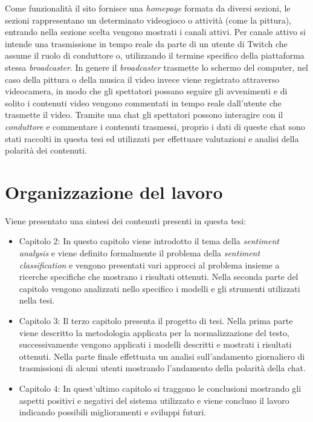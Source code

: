 \documentclass[a4paper,12pt,openright,twoside]{report}
\theoremstyle{definition}
\begin{document}
Come funzionalità il sito fornisce una \emph{homepage} formata da diversi sezioni, le sezioni rappresentano
un determinato videogioco o attività (come la pittura), entrando nella sezione scelta vengono
mostrati i canali attivi. Per canale attivo si intende una trasmissione in tempo reale da parte di un 
utente di Twitch che assume il ruolo di conduttore o, utilizzando il termine specifico della piattaforma stessa 
\emph{broadcaster}. In genere il \emph{broadcaster} trasmette lo schermo del computer,
nel caso della pittura o della musica il video invece viene registrato attraverso videocamera, in modo che gli
spettatori possano seguire gli avvenimenti e di solito i contenuti video vengono commentati in tempo reale
dall'utente che trasmette il video.
Tramite una chat gli spettatori possono interagire con il \emph{conduttore} e commentare i contenuti
trasmessi, proprio i dati di queste chat sono stati raccolti in questa tesi ed utilizzati per effettuare
valutazioni e analisi della polarità dei contenuti.

\section{Organizzazione del lavoro}
Viene presentato una sintesi dei contenuti presenti in questa tesi:
\begin{itemize}
\item Capitolo 2: In questo capitolo viene introdotto il tema della \emph{sentiment analysis} e
viene definito formalmente il problema della \emph{sentiment classification} e vengono presentati vari approcci al problema insieme a ricerche specifiche
che mostrano i risultati ottenuti.
Nella seconda
parte del capitolo vengono analizzati nello specifico i modelli e gli strumenti utilizzati nella tesi.
\item Capitolo 3: Il terzo capitolo presenta il progetto di tesi. Nella prima parte viene descritto
la metodologia applicata per la normalizzazione del testo, successivamente vengono applicati i modelli
descritti e mostrati i risultati ottenuti. Nella parte finale effettuata un analisi sull'andamento
giornaliero di trasmissioni di alcuni utenti mostrando l'andamento della polarità della chat.
\item Capitolo 4: In quest'ultimo capitolo si traggono le conclusioni mostrando gli aspetti positivi e negativi
del sistema utilizzato e viene concluso il lavoro indicando possibili miglioramenti e sviluppi futuri.
\end{itemize}
\end{document}
